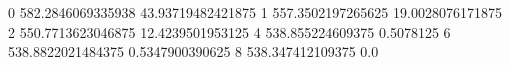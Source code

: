 0 582.2846069335938 43.93719482421875
1 557.3502197265625 19.0028076171875
2 550.7713623046875 12.4239501953125
4 538.855224609375 0.5078125
6 538.8822021484375 0.5347900390625
8 538.347412109375 0.0

